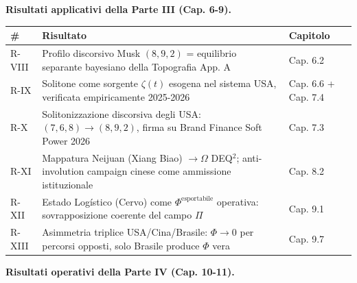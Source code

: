 \Proved{} \textbf{Risultati applicativi della Parte III (Cap. 6-9).}

{\def\LTcaptype{none} %
{\small\begin{longtable}[]{@{}
  >{\raggedright\arraybackslash}p{}
  >{\raggedright\arraybackslash}p{}
  >{\raggedright\arraybackslash}p{}@{}}
\toprule\noalign{}
\begin{minipage}[b]{\linewidth}\raggedright
\#
\end{minipage} & \begin{minipage}[b]{\linewidth}\raggedright
Risultato
\end{minipage} & \begin{minipage}[b]{\linewidth}\raggedright
Capitolo
\end{minipage} \\
\midrule\noalign{}
\endhead
\bottomrule\noalign{}
\endlastfoot
R-VIII & Profilo discorsivo Musk \((8, 9, 2)\) = equilibrio separante
bayesiano della Topografia App. A & Cap. 6.2 \\
R-IX & Solitone come sorgente \(\zeta(t)\) esogena nel sistema USA,
verificata empiricamente 2025-2026 & Cap. 6.6 + Cap. 7.4 \\
R-X & Solitonizzazione discorsiva degli USA: \((7,6,8) \to (8,9,2)\),
firma su Brand Finance Soft Power 2026 & Cap. 7.3 \\
R-XI & Mappatura Neijuan (Xiang Biao) \(\to \Omega\) DEQ$^2$;
anti-involution campaign cinese come ammissione istituzionale & Cap.
8.2 \\
R-XII & Estado Logístico (Cervo) come \(\Phi^{\text{esportabile}}\)
operativa: sovrapposizione coerente del campo \(\Pi\) & Cap. 9.1 \\
R-XIII & Asimmetria triplice USA/Cina/Brasile: \(\Phi \to 0\) per
percorsi opposti, solo Brasile produce \(\Phi\) vera & Cap. 9.7 \\
\end{longtable}}
}

\Proved{} \textbf{Risultati operativi della Parte IV (Cap. 10-11).}

